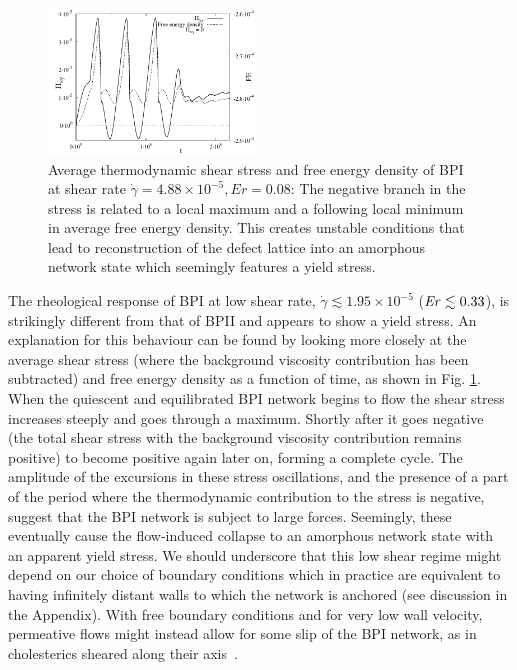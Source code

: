 \documentclass[8.5pt,twoside,twocolumn]{article}
\newcommand{\e}[1]{\times10^{#1}}
\newcommand{\gd}{\dot{\gamma}}
\begin{document}
\begin{figure}[htpb]
\includegraphics[width=0.495\textwidth]{stress_fe_yield_bp1.pdf}
\caption{Average thermodynamic shear stress and free energy density of BPI at shear rate 
$\gd=4.88\e{-5}, Er=0.08$: The negative branch in the stress is related to a local maximum and a following local 
minimum in average free energy density. This creates unstable conditions that lead 
to reconstruction of the defect lattice into an amorphous network state which 
seemingly features a yield stress.}
\label{bp1-fe-yield}
\end{figure}



The rheological response of BPI at low shear rate, $\gd\lesssim1.95\e{-5}$
(${\it Er} \lesssim 0.33$), 
is strikingly different from that of BPII and appears to show a
yield stress. An explanation for this behaviour can be found by 
looking more closely at the average shear stress (where the
background viscosity contribution has been subtracted) and 
free energy density as a function of time, as shown in Fig. \ref{bp1-fe-yield}.
When the quiescent and equilibrated BPI network begins to flow
the shear stress increases steeply and goes through a maximum.
Shortly after it goes negative (the total shear stress 
with the background viscosity contribution remains positive) 
to become positive again later on, forming a complete cycle.
The amplitude of the excursions in these stress oscillations, and
the presence of a part of the period where the thermodynamic
contribution to the stress is negative, suggest that the
BPI network is subject to large forces. Seemingly, these eventually
cause the flow-induced collapse to an amorphous network state with
an apparent yield stress. We should underscore that this
low shear regime might depend on our choice of boundary
conditions which in practice are equivalent to having infinitely
distant walls to which the network is anchored (see discussion
in the Appendix).
With free boundary conditions and for very low wall velocity, 
permeative flows might instead allow for
some slip of the BPI network, as in cholesterics sheared
along their axis~\cite{Marenduzzo:2006b}.
\end{document}
